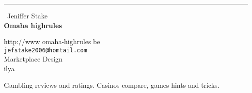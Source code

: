 \documentclass{report}
\begin{document}
\begin{center}
\rule{6in}{1pt} \
{\large Jeniffer Stake \\
{\bf Omaha highrules}}

http://www omaha-highrules be
\\
{\tt jefstake2006@homtail.com}\\
 Marketplace Design\\
	ilya\end{center}

Gambling reviews and ratings. Casinos compare, games hints and tricks.
\end{document}
